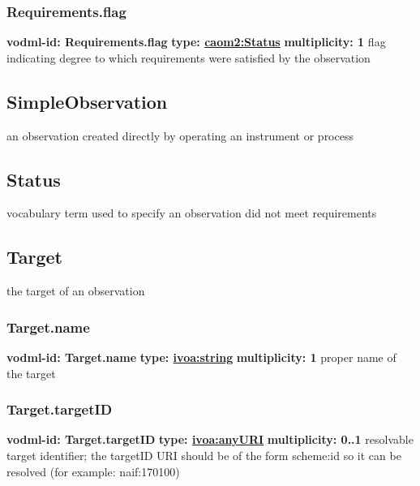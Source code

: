     \subsubsection{Requirements.flag}
      \textbf{vodml-id: Requirements.flag} \newline
      \textbf{type: \hyperref[sect:Status]{caom2:Status}} \newline
      \textbf{multiplicity: 1} \newline
      flag indicating degree to which requirements were satisfied by the observation

  \subsection{SimpleObservation}
  \label{sect:SimpleObservation}
    an observation created directly by operating an instrument or process

  \subsection{Status}
  \label{sect:Status}
    vocabulary term used to specify an observation did not meet requirements

  \subsection{Target}
  \label{sect:Target}
    the target of an observation

    \subsubsection{Target.name}
      \textbf{vodml-id: Target.name} \newline
      \textbf{type: \hyperref[sect:ivoa]{ivoa:string}} \newline
      \textbf{multiplicity: 1} \newline
      proper name of the target

    \subsubsection{Target.targetID}
      \textbf{vodml-id: Target.targetID} \newline
      \textbf{type: \hyperref[sect:ivoa]{ivoa:anyURI}} \newline
      \textbf{multiplicity: 0..1} \newline
      resolvable target identifier; the targetID URI should be of the form {scheme}:{id} so it can be resolved (for example: naif:170100)

